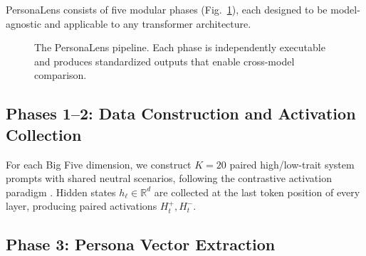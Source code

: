 \documentclass{article}
\begin{document}
PersonaLens consists of five modular phases (Fig.~\ref{fig:pipeline}), each designed to be model-agnostic and applicable to any transformer architecture.

\begin{figure}[t]
\centering
{}
\caption{The PersonaLens pipeline. Each phase is independently executable and produces standardized outputs that enable cross-model comparison.}
\label{fig:pipeline}
\end{figure}

\subsection{Phases 1--2: Data Construction and Activation Collection}\label{sec:data}

For each Big Five dimension, we construct $K{=}20$ paired high/low-trait system prompts with shared neutral scenarios, following the contrastive activation paradigm \citep{zou2023representation}. Hidden states $h_\ell \in \mathbb{R}^d$ are collected at the last token position of every layer, producing paired activations $H^+_t, H^-_t$.

\subsection{Phase 3: Persona Vector Extraction}\label{sec:extraction}
\end{document}
